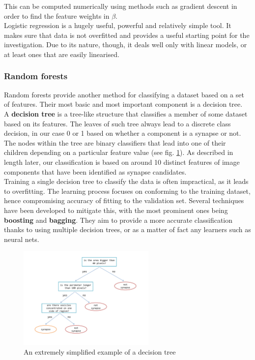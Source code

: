 \documentclass[a4paper, 11pt]{article}
\numberwithin{equation}{section}
\begin{document}
		\noindent This can be computed numerically using methods such as gradient descent in order to find the feature weights in $\beta$.\\
		Logistic regression is a hugely useful, powerful and relatively simple tool. It makes sure that data is not overfitted and provides a useful starting point for the investigation. Due to its nature, though, it deals well only with linear models, or at least ones that are easily linearised.
		
		\subsubsection{Random forests}
		Random forests provide another method for classifying a dataset based on a set of features. Their most basic and most important component is a decision tree.\\
		
		\noindent A \textbf{decision tree} is a tree-like structure that classifies a member of some dataset based on its features. The leaves of such tree always lead to a discrete class decision, in our case 0 or 1 based on whether a component is a synapse or not. The nodes within the tree are binary classifiers that lead into one of their children depending on a particular feature value (see fig. \ref{fig:decision_tree}). As described in length later, our classification is based on around 10 distinct features of image components that have been identified as synapse candidates.\\
		
		\noindent Training a single decision tree to classify the data is often impractical, as it leads to overfitting. The learning process focuses on conforming to the training dataset, hence compromising accuracy of fitting to the validation set. Several techniques have been developed to mitigate this, with the most prominent ones being \textbf{boosting} and \textbf{bagging}. They aim to provide a more accurate classification thanks to using multiple decision trees, or as a matter of fact any learners such as neural nets.
		
		\begin{figure}[!h]
			\centering
			\includegraphics[page=1,width=0.60\textwidth]{decision_tree.pdf}
			\caption{\label{fig:decision_tree}{An extremely simplified example of a decision tree}}
		\end{figure}
		
\end{document}
